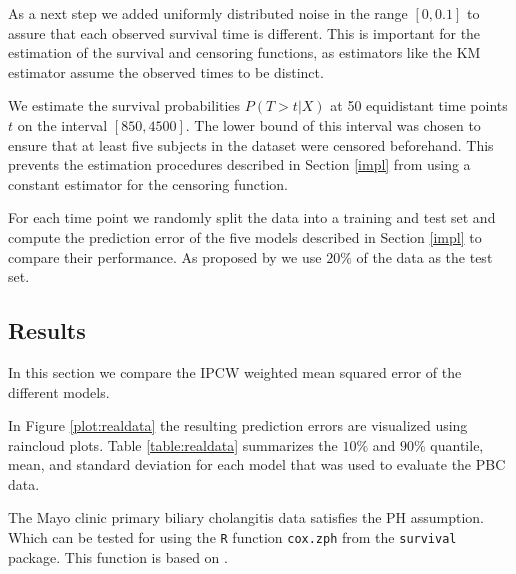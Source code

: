 \documentclass[12pt, a4paper]{scrartcl}
\theoremstyle{definition}
\theoremstyle{plain}
\numberwithin{equation}{section}
\numberwithin{figure}{section}
\numberwithin{table}{section}
\begin{document}
	As a next step we added uniformly distributed noise in the range $[0, 0.1]$ to assure that each observed survival time is different.
	This is important for the estimation of the survival and censoring functions, as estimators like the KM estimator assume the observed times to be distinct.
	
	We estimate the survival probabilities $P(T > t \vert X)$ at 50 equidistant time points $t$ on the interval $[850,4500]$.
	The lower bound of this interval was chosen to ensure that at least five subjects in the dataset were censored beforehand.
	This prevents the estimation procedures described in Section \ref{impl} from using a constant estimator for the censoring function.
	
	For each time point we randomly split the data into a training and test set and compute the prediction error of the five models described in Section \ref{impl} to compare their performance. 
	As proposed by \citet*{basearticle} we use $20\%$ of the data as the test set. 
	
	\subsection{Results}
	In this section we compare the IPCW weighted mean squared error of the different models.
	
	In Figure \ref{plot:realdata} the resulting prediction errors are visualized using raincloud plots.
	Table \ref{table:realdata} summarizes the $10\%$ and $90\%$ quantile, mean, and standard deviation for each model that was used to evaluate the PBC data.
	
	The Mayo clinic primary biliary cholangitis data satisfies the PH assumption.
	Which can be tested for using the \texttt{R} function \texttt{cox.zph} from the \texttt{survival} package.
	This function is based on \citet*{ph-test}.
	
\end{document}
